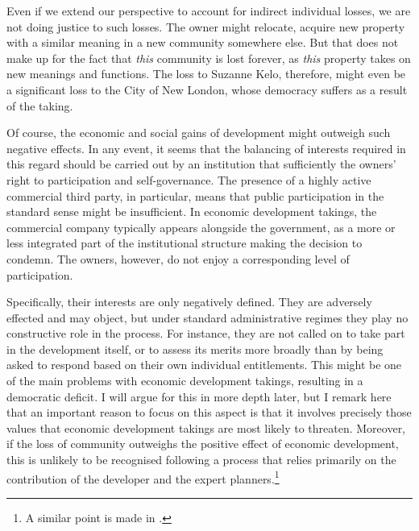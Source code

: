 Even if we extend our perspective to account for indirect individual losses, we are not doing justice to such losses. The owner might relocate, acquire new property with a similar meaning in a new community somewhere else. But that does not make up for the fact that {\it this} community is lost forever, as {\it this} property takes on new meanings and functions. The loss to Suzanne Kelo, therefore, might even be a significant loss to the City of New London, whose democracy suffers as a result of the taking.

Of course, the economic and social gains of development might outweigh such negative effects. In any event, it seems that the balancing of interests required in this regard should be carried out by an institution that sufficiently  the owners' right to participation and self-governance. The presence of a highly active commercial third party, in particular, means that public participation in the standard sense might be insufficient. In economic development takings, the commercial company typically appears alongside the government, as a more or less integrated part of the institutional structure making the decision to condemn. The owners, however, do not enjoy a corresponding level of participation.

Specifically, their interests are only negatively defined. They are adversely effected and may object, but under standard administrative regimes they play no constructive role in the process. For instance, they are not called on to take part in the development itself, or to assess its merits more broadly than by being asked to respond based on their own individual entitlements. This might be one of the main problems with economic development takings, resulting in a democratic deficit. I will argue for this in more depth later, but I remark here that an important reason to focus on this aspect is that it involves precisely those values that economic development takings are most likely to threaten. Moreover, if the loss of community outweighs the positive effect of economic development, this is unlikely to be recognised following a process that relies primarily on the contribution of the developer and the expert planners.\footnote{A similar point is made in \cite{underkuffler06}.} 

